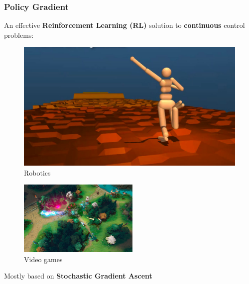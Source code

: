 \documentclass[aspectratio=169]{beamer}
\newcommand{\enb}[1]{\textcolor{poliblue1}{\textbf{#1}}}
\begin{document}
\begin{frame} 
\frametitle{Policy Gradient} 
An effective \enb{Reinforcement Learning (RL)} solution to \enb{continuous} control problems:

\begin{minipage}[t]{.4\paperwidth}
\begin{figure}
\includegraphics[width=\textwidth]{images/parkour.jpg}
\caption{Robotics~\citep{heess2017emergence}}
\end{figure}
\end{minipage}
\hfill%
\begin{minipage}[t]{.4\paperwidth}
\begin{figure}
\includegraphics[width=\textwidth, height=3.6cm]{images/dota.jpg}
\caption{Video games~\citep{openaifive}}
\end{figure}	
\end{minipage}

\vspace*{.5cm}

\large{Mostly based on \enb{Stochastic Gradient Ascent}~\citep{robbins1951stochastic}}

\end{frame}
\end{document}
